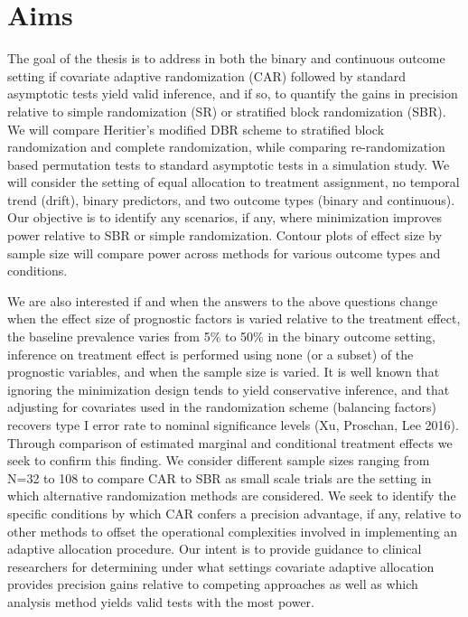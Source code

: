 \section{Aims}
The goal of the thesis is to address in both the binary and continuous outcome setting if covariate adaptive randomization (CAR) followed by standard asymptotic tests yield valid inference, and if so, to quantify the gains in precision relative to simple randomization (SR) or stratified block randomization (SBR).  
We will compare Heritier’s modified DBR scheme to stratified block randomization and complete randomization, while comparing re-randomization based permutation tests to standard asymptotic tests in a simulation study.  
We will consider the setting of equal allocation to treatment assignment, no temporal trend (drift), binary predictors, and two outcome types (binary and continuous).  
Our objective is to identify any scenarios, if any, where minimization improves power relative to SBR or simple randomization. 
Contour plots of effect size by sample size will compare power across methods for various outcome types and conditions. 

We are also interested if and when the answers to the above questions change when the effect size of prognostic factors is varied relative to the treatment effect, the baseline prevalence varies from 5\% to 50\% in the binary outcome setting, inference on treatment effect is performed using none (or a subset) of the prognostic variables, and when the sample size is varied.
It is well known that ignoring the minimization design tends to yield conservative inference, and that adjusting for covariates used in the randomization scheme (balancing factors) recovers type I error rate to nominal significance levels (Xu, Proschan, Lee 2016). 
Through comparison of estimated marginal and conditional treatment effects we seek to confirm this finding.
We consider different sample sizes ranging from N=32 to 108 to compare CAR to SBR as small scale trials are the setting in which alternative randomization methods are considered. 
We seek to identify the specific conditions by which CAR confers a precision advantage, if any, relative to other methods to offset the operational complexities involved in implementing an adaptive allocation procedure.  
Our intent is to provide guidance to clinical researchers for determining under what settings covariate adaptive allocation provides precision gains relative to competing approaches as well as which analysis method yields valid tests with the most power. 

